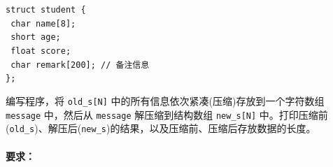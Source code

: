 \documentclass[supercite]{Experimental_Report}
\theoremstyle{definition}
\begin{document}
	\noindent \texttt{struct student \{} \\
	\texttt{\hspace*{2em} char  name[8];} \\
	\texttt{\hspace*{2em} short  age;} \\
	\texttt{\hspace*{2em} float  score;} \\
	\texttt{\hspace*{2em} char  remark[200];  // 备注信息} \\
	\texttt{\};}
	
	编写程序，将 \texttt{old\_s[N]} 中的所有信息依次紧凑(压缩)存放到一个字符数组 \texttt{message} 中，然后从 \texttt{message} 解压缩到结构数组 \texttt{new\_s[N]} 中。打印压缩前(\texttt{old\_s})、解压后(\texttt{new\_s})的结果，以及压缩前、压缩后存放数据的长度。
	
	\paragraph{要求：}
	
\end{document}
